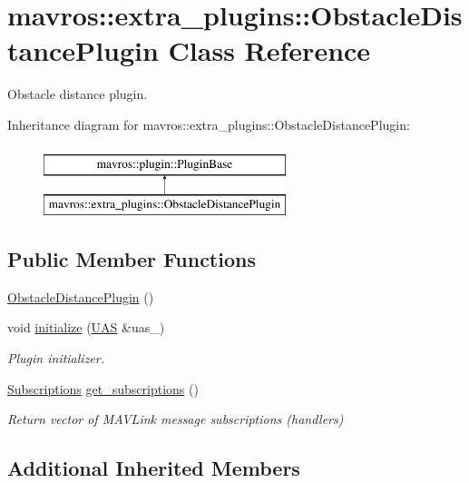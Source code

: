 \hypertarget{classmavros_1_1extra__plugins_1_1ObstacleDistancePlugin}{}\section{mavros\+::extra\+\_\+plugins\+::Obstacle\+Distance\+Plugin Class Reference}
\label{classmavros_1_1extra__plugins_1_1ObstacleDistancePlugin}


Obstacle distance plugin.  


Inheritance diagram for mavros\+::extra\+\_\+plugins\+::Obstacle\+Distance\+Plugin\+:\begin{figure}[H]
\begin{center}
\leavevmode
\includegraphics[height=2.000000cm]{classmavros_1_1extra__plugins_1_1ObstacleDistancePlugin}
\end{center}
\end{figure}
\subsection*{Public Member Functions}
\begin{DoxyCompactItemize}
\item 
\mbox{\hyperlink{group__plugin_gaab73ed3ac03f5dbde2e6ddd4264ccfb2}{Obstacle\+Distance\+Plugin}} ()
\item 
void \mbox{\hyperlink{group__plugin_gaf7844065d4ccf3cea88c251437553991}{initialize}} (\mbox{\hyperlink{classmavros_1_1UAS}{U\+AS}} \&uas\+\_\+)
\begin{DoxyCompactList}\small\item\em Plugin initializer. \end{DoxyCompactList}\item 
\mbox{\hyperlink{group__plugin_ga8967d61fc77040e0c3ea5a4585d62a09}{Subscriptions}} \mbox{\hyperlink{group__plugin_ga03eef1ca035e4ab4ca9eb0841b6d9eef}{get\+\_\+subscriptions}} ()
\begin{DoxyCompactList}\small\item\em Return vector of M\+A\+V\+Link message subscriptions (handlers) \end{DoxyCompactList}\end{DoxyCompactItemize}
\subsection*{Additional Inherited Members}


